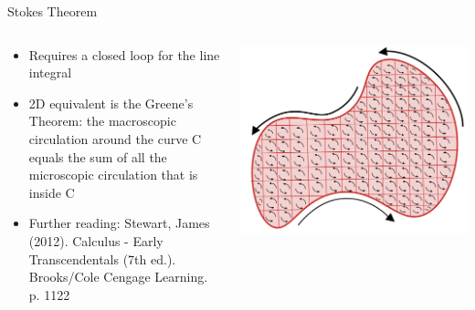 \documentclass[10pt,aspectratio=169,usenames,dvipsnames]{beamer}
\begin{document}
\begin{frame}{Stokes Theorem}
\begin{columns}
\begin{column}{0.5\textwidth}
\begin{itemize}
    \item Requires a closed loop for the line integral
    \item 2D equivalent is the Greene's Theorem:  the macroscopic circulation around the curve C equals the sum of all the microscopic circulation that is inside C
    \item Further reading: Stewart, James (2012). Calculus - Early Transcendentals (7th ed.). Brooks/Cole Cengage Learning. p. 1122
\end{itemize}
\end{column}
\begin{column}{0.5\textwidth}
\includegraphics[width=0.8\linewidth]{2023StAndrews/Screenshot from 2023-03-15 06-49-01.png}
\end{column}
\end{columns}
\end{frame}
\end{document}
